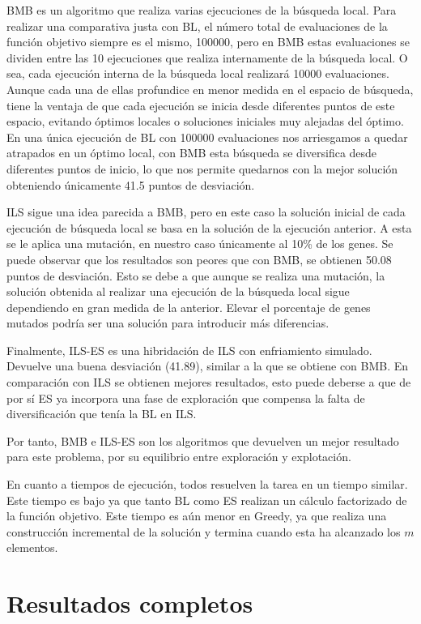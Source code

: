 BMB es un algoritmo que realiza varias ejecuciones de la búsqueda local. Para realizar una comparativa justa con BL, el número total de evaluaciones de la función objetivo siempre es el mismo, 100000, pero en BMB estas evaluaciones se dividen entre las 10 ejecuciones que realiza internamente de la búsqueda local. O sea, cada ejecución interna de la búsqueda local realizará 10000 evaluaciones. Aunque cada una de ellas profundice en menor medida en el espacio de búsqueda, tiene la ventaja de que cada ejecución se inicia desde diferentes puntos de este espacio, evitando óptimos locales o soluciones iniciales muy alejadas del óptimo. En una única ejecución de BL con 100000 evaluaciones nos arriesgamos a quedar atrapados en un óptimo local, con BMB esta búsqueda se diversifica desde diferentes puntos de inicio, lo que nos permite quedarnos con la mejor solución obteniendo únicamente 41.5 puntos de desviación.

ILS sigue una idea parecida a BMB, pero en este caso la solución inicial de cada ejecución de búsqueda local se basa en la solución de la ejecución anterior. A esta se le aplica una mutación, en nuestro caso únicamente al 10\% de los genes. Se puede observar que los resultados son peores que con BMB, se obtienen 50.08 puntos de desviación. Esto se debe a que aunque se realiza una mutación, la solución obtenida al realizar una ejecución de la búsqueda local sigue dependiendo en gran medida de la anterior. Elevar el porcentaje de genes mutados podría ser una solución para introducir más diferencias.

Finalmente, ILS-ES es una hibridación de ILS con enfriamiento simulado. Devuelve una buena desviación (41.89), similar a la que se obtiene con BMB. En comparación con ILS se obtienen mejores resultados, esto puede deberse a que de por sí ES ya incorpora una fase de exploración que compensa la falta de diversificación que tenía la BL en ILS.

Por tanto, BMB e ILS-ES son los algoritmos que devuelven un mejor resultado para este problema, por su equilibrio entre exploración y explotación.

En cuanto a tiempos de ejecución, todos resuelven la tarea en un tiempo similar. Este tiempo es bajo ya que tanto BL como ES realizan un cálculo factorizado de la función objetivo. Este tiempo es aún menor en Greedy, ya que realiza una construcción incremental de la solución y termina cuando esta ha alcanzado los $m$ elementos.

\section{Resultados completos}
